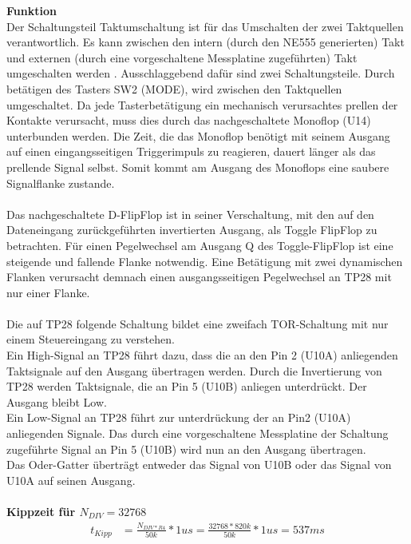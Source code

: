 \textbf{Funktion}
\\
Der Schaltungsteil \glqq Taktumschaltung \grqq{} ist für das Umschalten der zwei Taktquellen verantwortlich. Es kann zwischen den intern (durch den NE555 generierten) Takt und externen (durch eine vorgeschaltene Messplatine zugeführten) Takt umgeschalten werden . Ausschlaggebend dafür sind zwei Schaltungsteile. Durch betätigen des Tasters SW2 (MODE), wird zwischen den Taktquellen umgeschaltet. Da jede Tasterbetätigung ein mechanisch verursachtes prellen der Kontakte verursacht, muss dies durch das nachgeschaltete  Monoflop (U14) unterbunden werden. Die Zeit, die das Monoflop benötigt mit seinem Ausgang auf einen eingangsseitigen Triggerimpuls zu reagieren, dauert länger als das prellende Signal selbst. Somit kommt am Ausgang des Monoflops eine saubere Signalflanke zustande. 
\\
\\
Das nachgeschaltete D-FlipFlop ist in seiner Verschaltung, mit den auf den Dateneingang zurückgeführten invertierten Ausgang, als Toggle FlipFlop zu betrachten. Für einen Pegelwechsel am Ausgang Q des Toggle-FlipFlop ist eine steigende und fallende Flanke notwendig. Eine Betätigung mit zwei dynamischen Flanken verursacht demnach einen ausgangsseitigen Pegelwechsel an TP28 mit nur einer Flanke. 
\\
\\
Die auf TP28 folgende Schaltung bildet eine zweifach TOR-Schaltung mit nur einem Steuereingang zu verstehen.
\\
Ein High-Signal an TP28 führt dazu, dass die an den Pin 2 (U10A) anliegenden Taktsignale auf den Ausgang übertragen werden. Durch die Invertierung von TP28 werden Taktsignale, die an Pin 5 (U10B) anliegen unterdrückt. Der Ausgang bleibt Low.
\\
Ein Low-Signal an TP28 führt zur unterdrückung der an Pin2 (U10A) anliegenden Signale. Das durch eine vorgeschaltene Messplatine der Schaltung zugeführte Signal an Pin 5 (U10B) wird nun an den Ausgang übertragen.
\\
Das Oder-Gatter überträgt entweder das Signal von U10B oder das Signal von U10A auf seinen Ausgang. 
\\
\\
\textbf{Kippzeit für $N_{DIV} = 32 768$}
\\
\begin{align*}
	t_{Kipp} &= \frac{N_{DIV * R4}}{50k} * 1us = \frac{32768 * 820k}{50k} * 1us = 537ms
\end{align*}


